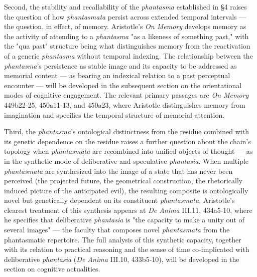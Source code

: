 \documentclass[12pt]{article}
\begin{document}
{Second, the stability and recallability of the \textit{phantasma} established in §4 raises the question of how \textit{phantasmata} persist across extended temporal intervals --- the question, in effect, of memory. Aristotle's \textit{On Memory} develops memory as the activity of attending to a \textit{phantasma} "as a likeness of something past," with the "qua past" structure being what distinguishes memory from the reactivation of a generic \textit{phantasma} without temporal indexing. The relationship between the \textit{phantasma}'s persistence as stable image and its capacity to be addressed as memorial content --- as bearing an indexical relation to a past perceptual encounter --- will be developed in the subsequent section on the orientational modes of cognitive engagement. The relevant primary passages are \textit{On Memory} 449b22-25, 450a11-13, and 450a23, where Aristotle distinguishes memory from imagination and specifies the temporal structure of memorial attention.

Third, the \textit{phantasma}'s ontological distinctness from the residue combined with its genetic dependence on the residue raises a further question about the chain's topology when \textit{phantasmata} are recombined into unified objects of thought --- as in the synthetic mode of deliberative and speculative \textit{phantasia}. When multiple \textit{phantasmata} are synthesized into the image of a state that has never been perceived (the projected future, the geometrical construction, the rhetorically induced picture of the anticipated evil), the resulting composite is ontologically novel but genetically dependent on its constituent \textit{phantasmata}. Aristotle's clearest treatment of this synthesis appears at \textit{De Anima} III.11, 434a5-10, where he specifies that deliberative \textit{phantasia} is "the capacity to make a unity out of several images" --- the faculty that composes novel \textit{phantasmata} from the phantasmatic repertoire. The full analysis of this synthetic capacity, together with its relation to practical reasoning and the sense of time co-implicated with deliberative \textit{phantasia} (\textit{De Anima} III.10, 433b5-10), will be developed in the section on cognitive actualities.}
\end{document}
